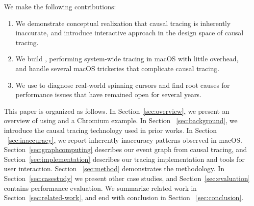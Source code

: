 We make the following contributions: 
\begin{enumerate}

\item We demonstrate conceptual realization that causal tracing is inherently
inaccurate, and introduce interactive approach in the design space of causal
tracing.

\item We build \xxx, performing system-wide tracing in macOS with little
overhead, and handle several macOS trickeries that complicate causal tracing.

\item We use \xxx to diagnose real-world spinning cursors and find root causes for
performance issues that have remained open for several years.

\end{enumerate}

This paper is organized as follows. In Section~\ref{sec:overview}, we present
an overview of using \xxx and a Chromium example. In Section
~\ref{sec:background}, we introduce the causal tracing technology used in prior
works. In Section ~\ref{sec:inaccuracy}, we report inherently inaccuracy
patterns observed in macOS.  Section~\ref{sec:graphcomputing} describes our
event graph from causal tracing, and Section~\ref{sec:implementation} describes
our tracing implementation and tools for user interaction. Section
~\ref{sec:method} demonstrates the methodology. In Section~\ref{sec:casestudy}
we present other case studies, and Section~\ref{sec:evaluation} contains
performance evaluation.  We summarize related work in
Section~\ref{sec:related-work}, and end with conclusion in Section
~\ref{sec:conclusion}.
